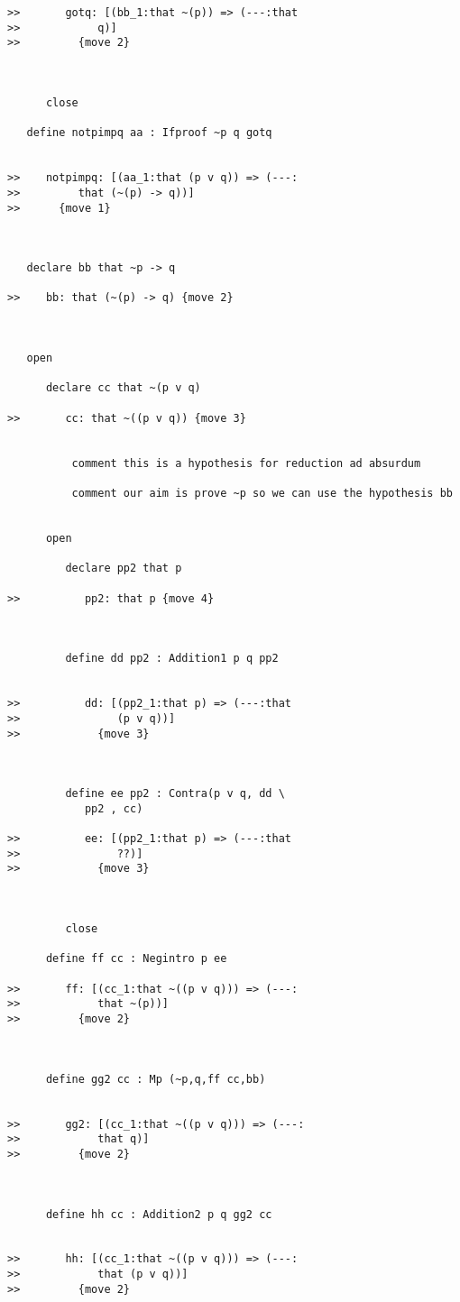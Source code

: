 \documentclass[12pt]{article}
\begin{document}
\begin{verbatim}
>>       gotq: [(bb_1:that ~(p)) => (---:that
>>            q)]
>>         {move 2}



      close

   define notpimpq aa : Ifproof ~p q gotq


>>    notpimpq: [(aa_1:that (p v q)) => (---:
>>         that (~(p) -> q))]
>>      {move 1}



   declare bb that ~p -> q

>>    bb: that (~(p) -> q) {move 2}



   open

      declare cc that ~(p v q)

>>       cc: that ~((p v q)) {move 3}


          comment this is a hypothesis for reduction ad absurdum

          comment our aim is prove ~p so we can use the hypothesis bb


      open

         declare pp2 that p

>>          pp2: that p {move 4}



         define dd pp2 : Addition1 p q pp2


>>          dd: [(pp2_1:that p) => (---:that
>>               (p v q))]
>>            {move 3}



         define ee pp2 : Contra(p v q, dd \
            pp2 , cc)

>>          ee: [(pp2_1:that p) => (---:that
>>               ??)]
>>            {move 3}



         close

      define ff cc : Negintro p ee

>>       ff: [(cc_1:that ~((p v q))) => (---:
>>            that ~(p))]
>>         {move 2}



      define gg2 cc : Mp (~p,q,ff cc,bb)


>>       gg2: [(cc_1:that ~((p v q))) => (---:
>>            that q)]
>>         {move 2}



      define hh cc : Addition2 p q gg2 cc


>>       hh: [(cc_1:that ~((p v q))) => (---:
>>            that (p v q))]
>>         {move 2}




\end{verbatim}
\end{document}
